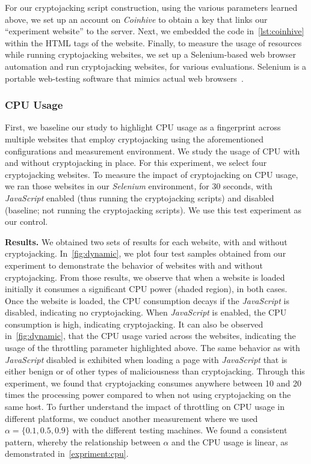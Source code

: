 \documentclass[acmlarge]{acmart}
\newcommand{\BfPara}[1]{{\noindent\bf#1.}\xspace\xspace}
\newcommand{\slx}{{\em Selenium}\xspace}
\newcommand{\ch}{{\em Coinhive}\xspace}
\newcommand{\js}{{\em JavaScript}\xspace}
\newcommand{\cj}{cryptojacking\xspace}
\begin{document}
For our \cj script construction, using the various parameters learned above, we set up an account on \ch to obtain a key that links our ``experiment website'' to the server. Next, we embedded the code in~\autoref{lst:coinhive} within the HTML tags of the website. Finally, to measure the usage of resources while running \cj websites, we set up a Selenium-based web browser automation and run \cj websites, for various evaluations. Selenium is a portable web-testing software that mimics actual web browsers~\cite{bruns2009web,seleniumdocumentation}. 



\subsubsection{CPU Usage} 
First, we baseline our study to highlight CPU usage as a fingerprint across multiple websites that employ \cj using the aforementioned configurations and measurement environment. We study the usage of CPU with and without \cj in place. For this experiment, we select four \cj websites. To measure the impact of \cj on CPU usage, we ran those websites in our \slx environment, for 30 seconds, with \js enabled (thus running the \cj scripts) and disabled (baseline; not running the \cj scripts). We use this test experiment as our control. 



\BfPara{Results} We obtained two sets of results for each website, with and without \cj. In~\autoref{fig:dynamic}, we plot four test samples obtained from our experiment to demonstrate the behavior of websites with and without \cj. From those results, we observe that when a website is loaded initially it consumes a significant CPU power (shaded region), in both cases. Once the website is loaded, the CPU consumption decays if the \js is disabled, indicating no \cj. When \js is enabled, the CPU consumption is high, indicating \cj. It can also be observed in~\autoref{fig:dynamic}, that the CPU usage varied across the websites, indicating the usage of the throttling parameter highlighted above. The same behavior as with \js disabled is exhibited when loading a page with \js that is either benign or of other types of maliciousness than \cj. Through this experiment, we found that \cj consumes anywhere between 10 and 20 times the processing power compared to when not using \cj on the same host. To further understand the impact of throttling on CPU usage in different platforms, we conduct another measurement where we used $\alpha=\{0.1, 0.5, 0.9\}$ with the different testing machines. We found a consistent pattern, whereby the relationship between $\alpha$ and the CPU usage is linear, as demonstrated in~\autoref{expriment:cpu}.
\end{document}

